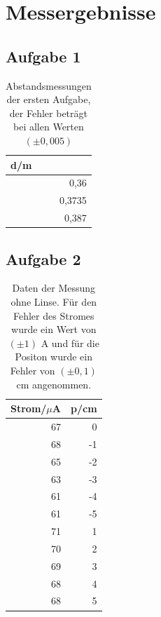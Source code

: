 \documentclass[12pt]{scrartcl}
\begin{document}
\section{Messergebnisse}

\subsection{Aufgabe 1}
\begin{table}[H]
\caption{Abstandsmessungen der ersten Aufgabe, der Fehler beträgt bei allen Werten $(\pm 0,005)$}
\centering
\begin{tabular}{|r|}
\hline
\multicolumn{1}{|l|}{d/m} \\ \hline
0,36 \\ \hline
0,3735 \\ \hline
0,387 \\ \hline
\end{tabular}
\label{tab:a_1}
\end{table}

\subsection{Aufgabe 2}
\begin{table}[H]
\caption{Daten der Messung ohne Linse. Für den Fehler des Stromes wurde ein Wert von $(\pm 1)$ A und für die Positon wurde ein Fehler von $(\pm 0,1)$ cm angenommen.}
\centering
\begin{tabular}{|r|r|}
\hline
\multicolumn{1}{|l|}{Strom/$\mu$A} & \multicolumn{1}{l|}{p/cm} \\ \hline
67 & 0 \\ \hline
68 & -1 \\ \hline
65 & -2 \\ \hline
63 & -3 \\ \hline
61 & -4 \\ \hline
61 & -5 \\ \hline
71 & 1 \\ \hline
70 & 2 \\ \hline
69 & 3 \\ \hline
68 & 4 \\ \hline
68 & 5 \\ \hline
\end{tabular}
\label{tab:a_2_o}
\end{table}
\end{document}
